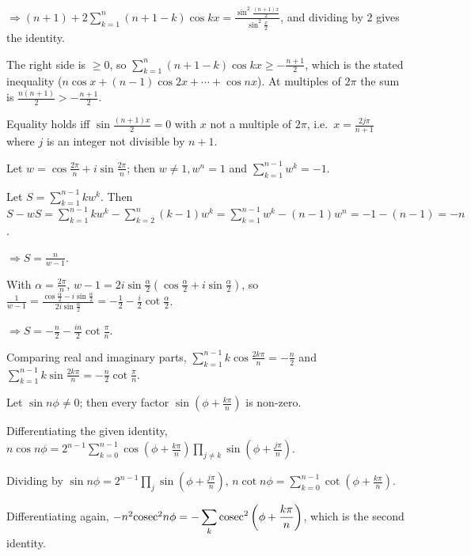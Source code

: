   $\Rightarrow(n + 1) + 2\displaystyle\sum_{k = 1}^n(n + 1 - k)\cos kx = \frac{\sin^2\frac{(n +
      1)x}{2}}{\sin^2\frac{x}{2}}$, and dividing by $2$ gives the identity.

  The right side is $\geq 0$, so $\displaystyle\sum_{k = 1}^n(n + 1 - k)\cos kx\geq -\frac{n + 1}{2}$, which
  is the stated inequality ($n\cos x + (n - 1)\cos2x + \cdots + \cos nx$). At multiples of $2\pi$ the sum is
  $\frac{n(n + 1)}{2} > -\frac{n + 1}{2}$.

  Equality holds iff $\sin\frac{(n + 1)x}{2} = 0$ with $x$ not a multiple of $2\pi$, i.e.\ $x = \frac{2j\pi}{n +
    1}$ where $j$ is an integer not divisible by $n + 1$.
\item Let $w = \cos\frac{2\pi}{n} + i\sin\frac{2\pi}{n}$; then $w\neq 1, w^n = 1$ and $\displaystyle\sum_{k =
    1}^{n - 1}w^k = -1$.

  Let $S = \displaystyle\sum_{k = 1}^{n - 1}kw^k$. Then $S - wS = \displaystyle\sum_{k = 1}^{n - 1}kw^k -
  \sum_{k = 2}^{n}(k - 1)w^k = \sum_{k = 1}^{n - 1}w^k - (n - 1)w^n = -1 - (n - 1) = -n$.

  $\Rightarrow S = \frac{n}{w - 1}$.

  With $\alpha = \frac{2\pi}{n}$, $w - 1 = 2i\sin\frac{\alpha}{2}\left(\cos\frac{\alpha}{2} +
  i\sin\frac{\alpha}{2}\right)$, so $\frac{1}{w - 1} = \frac{\cos\frac{\alpha}{2} -
    i\sin\frac{\alpha}{2}}{2i\sin\frac{\alpha}{2}} = -\frac{1}{2} - \frac{i}{2}\cot\frac{\alpha}{2}$.

  $\Rightarrow S = -\frac{n}{2} - \frac{in}{2}\cot\frac{\pi}{n}$.

  Comparing real and imaginary parts, $\displaystyle\sum_{k = 1}^{n - 1}k\cos\frac{2k\pi}{n} = -\frac{n}{2}$ and
  $\displaystyle\sum_{k = 1}^{n - 1}k\sin\frac{2k\pi}{n} = -\frac{n}{2}\cot\frac{\pi}{n}$.
\item Let $\sin n\phi\neq 0$; then every factor $\sin\left(\phi + \frac{k\pi}{n}\right)$ is non-zero.

  Differentiating the given identity, $n\cos n\phi = 2^{n - 1}\displaystyle\sum_{k = 0}^{n - 1}\cos\left(\phi
  + \frac{k\pi}{n}\right)\prod_{j\neq k}\sin\left(\phi + \frac{j\pi}{n}\right)$.

  Dividing by $\sin n\phi = 2^{n - 1}\displaystyle\prod_j\sin\left(\phi + \frac{j\pi}{n}\right)$,
  $n\cot n\phi = \displaystyle\sum_{k = 0}^{n - 1}\cot\left(\phi + \frac{k\pi}{n}\right)$.

  Differentiating again, $-n^2{\rm cosec}^2n\phi = -\displaystyle\sum_k{\rm cosec}^2\left(\phi + \frac{k\pi}{n}\right)$,
  which is the second identity.

